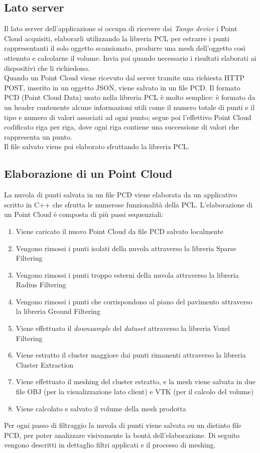 \newpage

\subsection{Lato server}
Il lato server dell'applicazione si occupa di ricevere dai \emph{Tango device} i Point Cloud acquisiti, elaborarli utilizzando la libreria PCL per estrarre i punti rappresentanti il solo oggetto scansionato, produrre una mesh dell'oggetto così ottenuto e calcolarne il volume. Invia poi quando necessario i risultati elaborati ai dispositivi che li richiedono.\\
Quando un Point Cloud viene ricevuto dal server tramite una richiesta HTTP POST, inserito in un oggetto JSON, viene salvato in un file PCD. Il formato PCD (Point Cloud Data) usato nella libreria PCL è molto semplice: è formato da un header contenente alcune informazioni utili come il numero totale di punti e il tipo e numero di valori associati ad ogni punto; segue poi l'effettivo Point Cloud codificato riga per riga, dove ogni riga contiene una successione di valori che rappresenta un punto.\\
Il file salvato viene poi elaborato sfruttando la libreria PCL.

\subsection{Elaborazione di un Point Cloud}

La nuvola di punti salvata in un file PCD viene elaborata da un applicativo scritto in C++ che sfrutta le numerose funzionalità della PCL.
L'elaborazione di un Point Cloud è composta di più passi sequenziali:
\begin{enumerate}
\item Viene caricato il nuovo Point Cloud da file PCD salvato localmente
\item Vengono rimossi i punti isolati della nuvola attraverso la libreria Sparse Filtering
\item Vengono rimossi i punti troppo esterni della nuvola attraverso la libreria Radius Filtering 
\item Vengono rimossi i punti che corrispondono al piano del pavimento attraverso la libreria Ground Filtering
\item Viene effettuato il \emph{downsample} del \emph{dataset} attraverso la libreria Voxel Filtering
\item Viene estratto il cluster maggiore dai punti rimanenti attraverso la libreria Cluster Extraction
\item Viene effettuato il meshing del cluster estratto, e la mesh viene salvata in due file OBJ (per la visualizzazione lato client) e VTK (per il calcolo del volume)
\item Viene calcolato e salvato il volume della mesh prodotta
\end{enumerate}
Per ogni passo di filtraggio la nuvola di punti viene salvata su un distinto file PCD, per poter analizzare visivamente la bontà dell'elaborazione.
Di seguito vengono descritti in dettaglio filtri applicati e il processo di meshing.

